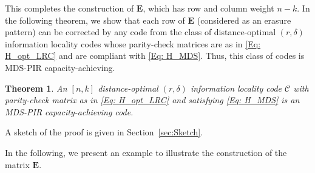 \documentclass[twocolumn,conference]{IEEEtran}
\newtheorem{theorem}{Theorem}
\newcommand{\set}[1]{\mathcal{#1}}           %
\newcommand{\vect}[1]{\bm{#1}}               %
\newcommand{\Nat}[1]{\mathbb{N}_{#1}}        %
\newcommand{\code}[1]{\mathcal{#1}}          %
\newcommand{\const}[1]{\textnormal{\usefont{U}{eur}{m}{n}\selectfont #1}} %
\begin{document}
\begin{enumerate}
%  
\end{enumerate}
This completes the construction of $\bm E$, which has row and column weight $n-k$. In the following theorem, we show
that each row of $\bm E$ (considered as an erasure pattern) can be corrected by any code from the class of 
  distance-optimal $(r,\delta)$ information locality codes whose parity-check matrices are as in \cref{Eq: H_opt_LRC}
and are compliant with \cref{Eq: H_MDS}. Thus, this class of codes is MDS-PIR capacity-achieving.
\begin{theorem}
  \label{Th: LRCcap_proof}
  An $[n,k]$ distance-optimal $(r,\delta)$ information locality code $\code{C}$ with parity-check matrix as in
  \cref{Eq: H_opt_LRC} and satisfying \cref{Eq: H_MDS} is an MDS-PIR capacity-achieving code.
\end{theorem}
\begin{IEEEproof}
A sketch of the proof is given in Section~\ref{sec:Sketch}.
\end{IEEEproof}

In the following, we present an example to illustrate the construction of the matrix $\bm E$. 
\end{document}
